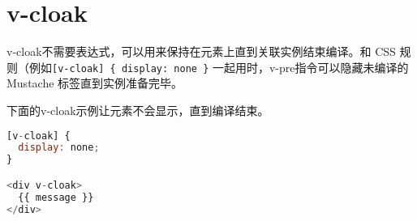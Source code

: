 \begin{lstlisting}[language=JavaScript]

\end{lstlisting}




\begin{lstlisting}[language=JavaScript]

\end{lstlisting}




\begin{lstlisting}[language=JavaScript]

\end{lstlisting}




\begin{lstlisting}[language=JavaScript]

\end{lstlisting}




\begin{lstlisting}[language=JavaScript]

\end{lstlisting}




\begin{lstlisting}[language=JavaScript]

\end{lstlisting}




\begin{lstlisting}[language=JavaScript]

\end{lstlisting}

\chapter{v-cloak}

v-cloak不需要表达式，可以用来保持在元素上直到关联实例结束编译。和 CSS 规则（例如\texttt{[v-cloak] \{ display: none \}} 一起用时，v-pre指令可以隐藏未编译的 Mustache 标签直到实例准备完毕。

下面的v-cloak示例让元素不会显示，直到编译结束。

\begin{lstlisting}[language=JavaScript]
[v-cloak] {
  display: none;
}

<div v-cloak>
  {{ message }}
</div>
\end{lstlisting}



